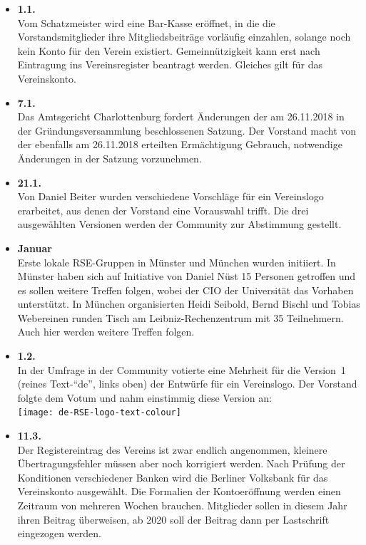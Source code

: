 \begin{itemize}
 \item \textbf{1.1.}\\
  Vom Schatzmeister wird eine Bar-Kasse eröffnet, in die die
  Vorstandsmitglieder ihre Mitgliedsbeiträge vorläufig einzahlen,
  solange noch kein Konto für den Verein existiert.
  Gemeinnützigkeit kann erst nach Eintragung ins Vereinsregister beantragt
  werden. Gleiches gilt für das Vereinskonto.
 \item \textbf{7.1.}\\
  Das Amtsgericht Charlottenburg fordert Änderungen der am 26.11.2018 in der
  Gründungsversammlung beschlossenen Satzung. Der
  Vorstand macht von der ebenfalls am 26.11.2018 erteilten Ermächtigung
  Gebrauch, notwendige Änderungen in der Satzung vorzunehmen.
 \item \textbf{21.1.}\\
  Von Daniel Beiter wurden verschiedene Vorschläge für ein Vereinslogo erarbeitet, aus denen der Vorstand eine Vorauswahl trifft.
  Die drei ausgewählten Versionen werden der Community zur
  Abstimmung gestellt.
 \item \textbf{Januar}\\
  Erste lokale RSE-Gruppen in Münster und München wurden initiiert. In Münster haben sich auf Initiative von Daniel Nüst 15 Personen getroffen und es sollen weitere
  Treffen folgen, wobei der CIO der Universität das Vorhaben unterstützt.
  In München organisierten Heidi Seibold, Bernd Bischl und Tobias Webereinen runden Tisch am Leibniz-Rechenzentrum mit 35 Teilnehmern. Auch hier werden weitere Treffen folgen.
 \item \textbf{1.2.}\\
  In der Umfrage in der Community votierte eine Mehrheit
  für die Version~1 (reines Text-"`de"', links oben) der Entwürfe für ein Vereinslogo.
  Der Vorstand folgte dem Votum und nahm einstimmig diese Version an:\\
  \texttt{[image: de-RSE-logo-text-colour]}
 \item \textbf{11.3.}\\
  Der Registereintrag des Vereins ist zwar endlich angenommen, kleinere Übertragungsfehler
  müssen aber noch korrigiert werden.
  Nach Prüfung der Konditionen verschiedener Banken wird die Berliner
  Volksbank für das Vereinskonto ausgewählt. Die Formalien der Kontoeröffnung werden
  einen Zeitraum von mehreren Wochen brauchen.
  Mitglieder sollen in diesem Jahr ihren Beitrag überweisen, ab 2020 soll
  der Beitrag dann per Lastschrift eingezogen werden.

\end{itemize}
